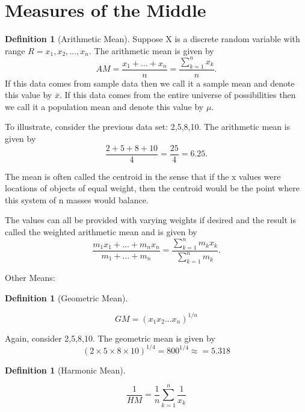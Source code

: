 \documentclass[10pt,]{book}
\theoremstyle{plain}
\theoremstyle{definition}
\newtheorem{definition}[theorem]{Definition}
\theoremstyle{definition}
\numberwithin{equation}{section}
\begin{document}
\section[Measures of the Middle]{Measures of the Middle}\label{section-7}
\begin{definition}[Arithmetic Mean]\label{definition-7}
Suppose X is a discrete random variable with range 
	\(R = {x_1, x_2, ..., x_n}\). 
	The arithmetic mean is given by
		\begin{equation*}
		AM = \frac{x_1 + ... + x_n}{n} = \frac{\sum_{k=1}^n x_k}{n}.
		\end{equation*}
	If this data comes from sample data then we call it a sample mean and denote this value by \(\overline{x}\). If this data comes from the entire universe of possibilities then we call it a population mean and denote this value by \(\mu\).%
\end{definition}

	To illustrate, consider the previous data set: {2,5,8,10}. The arithmetic mean is given by
	\begin{equation*}\frac{2+5+8+10}{4} = \frac{25}{4} = 6.25.\end{equation*}
\par

	The mean is often called the centroid in the sense that if the x values were locations of objects of equal weight, then the centroid
	would be the point where this system of n masses would balance. 
\par

	The values can all be provided with varying weights if desired and the result is called the weighted arithmetic mean and is given by
		\begin{equation*}
		\frac{m_1 x_1 + ... + m_n x_n}{m_1 + ... + m_n} = \frac{\sum_{k=1}^n m_k x_k}{\sum_{k=1}^n m_k}.
		\end{equation*}
\par

Other Means:
%
\begin{definition}[Geometric Mean]\label{definition-8}

	\begin{equation*}GM = (x_1 x_2 ... x_n)^{1/n}\end{equation*}
%
\end{definition}
\par

	Again, consider {2,5,8,10}. The geometric mean is given by
	\begin{equation*}(2 \times 5 \times 8 \times 10)^{1/4} = 800^{1/4} \approx = 5.318\end{equation*}
\begin{definition}[Harmonic Mean]\label{definition-9}

	\begin{equation*}\frac{1}{HM} = \frac{1}{n} \sum_{k=1}^n \frac{1}{x_k}\end{equation*}
%
\end{definition}
\par
\end{document}
